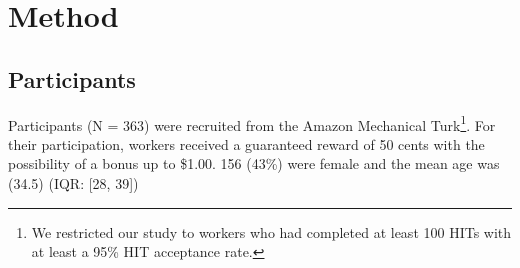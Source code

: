 \documentclass[a4paper,doc,natbib,floatsintext]{apa6}\usepackage[]{graphicx}\usepackage[]{color}
\begin{document}















\section{Method}

\subsection{Participants}

Participants (N = 363) were recruited from the Amazon Mechanical Turk\footnote{We restricted our study to workers who had completed at least 100 HITs with at least a 95\% HIT acceptance rate.}. For their participation, workers received a guaranteed reward of 50 cents with the possibility of a bonus up to \$1.00. 156 (43\%) were female and the mean age was (34.5) (IQR: [28, 39])
\end{document}
